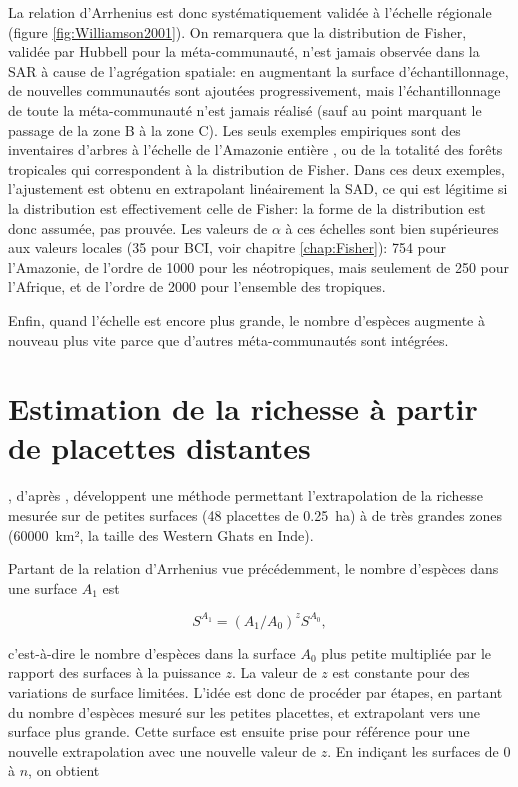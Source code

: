 \documentclass[
  11pt,
  french,
  a4paper,
  extrafontsizes,onecolumn,openright
  ]{memoir}
\begin{document}
La relation d'Arrhenius est donc systématiquement validée à l'échelle régionale (figure \ref{fig:Williamson2001}).
On remarquera que la distribution de Fisher, validée par Hubbell pour la méta-communauté, n'est jamais observée dans la SAR à cause de l'agrégation spatiale: en augmentant la surface d'échantillonnage, de nouvelles communautés sont ajoutées progressivement, mais l'échantillonnage de toute la méta-communauté n'est jamais réalisé (sauf au point marquant le passage de la zone B à la zone C).
Les seuls exemples empiriques sont des inventaires d'arbres à l'échelle de l'Amazonie entière \autocite{TerSteege2013}, ou de la totalité des forêts tropicales \autocite{Slik2015} qui correspondent à la distribution de Fisher. Dans ces deux exemples, l'ajustement est obtenu en extrapolant linéairement la SAD, ce qui est légitime \autocite{Izsak2012} si la distribution est effectivement celle de Fisher: la forme de la distribution est donc assumée, pas prouvée.
Les valeurs de \(\alpha\) à ces échelles sont bien supérieures aux valeurs locales (35 pour BCI, voir chapitre \ref{chap:Fisher}): 754 pour l'Amazonie, de l'ordre de 1000 pour les néotropiques, mais seulement de 250 pour l'Afrique, et de l'ordre de 2000 pour l'ensemble des tropiques.

Enfin, quand l'échelle est encore plus grande, le nombre d'espèces augmente à nouveau plus vite parce que d'autres méta-communautés sont intégrées.

\hypertarget{estimation-de-la-richesse-uxe0-partir-de-placettes-distantes}{%
\section{Estimation de la richesse à partir de placettes distantes}\label{estimation-de-la-richesse-uxe0-partir-de-placettes-distantes}}

\textcite{Krishnamani2004}, d'après \textcite{Harte1999}, développent une méthode permettant l'extrapolation de la richesse mesurée sur de petites surfaces (48 placettes de 0.25~ha) à de très grandes zones (60000~km², la taille des Western Ghats en Inde).

Partant de la relation d'Arrhenius vue précédemment, le nombre d'espèces dans une surface \(A_1\) est

\begin{equation}
  \label{eq:NsA1}
  S^{A_1} = \left({A_1}/{A_0}\right)^z{S^{A_0}},
\end{equation}

c'est-à-dire le nombre d'espèces dans la surface \(A_0\) plus petite multipliée par le rapport des surfaces à la puissance \(z\).
La valeur de \(z\) est constante pour des variations de surface limitées.
L'idée est donc de procéder par étapes, en partant du nombre d'espèces mesuré sur les petites placettes, et extrapolant vers une surface plus grande.
Cette surface est ensuite prise pour référence pour une nouvelle extrapolation avec une nouvelle valeur de \(z\).
En indiçant les surfaces de 0 à \(n\), on obtient
\end{document}

